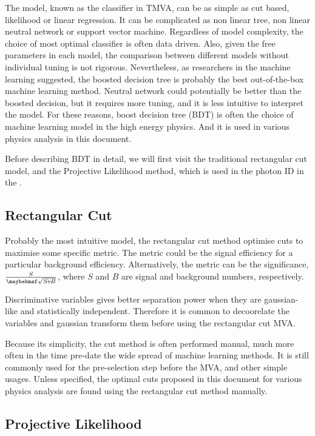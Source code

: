 The model, known as the classifier in TMVA, can be as simple as cut based, likelihood or linear regression. It can be complicated as non linear tree, non linear neutral network or support vector machine. Regardless of model complexity, the choice of most optimal classifier is often data driven. Also, given the free parameters in each model, the comparison between different models without individual tuning is not rigorous. Nevertheless, as researchers in the machine learning suggested, the boosted decision tree is probably the best out-of-the-box machine learning method. Neutral network could potentially be better than the boosted decision, but it requires more tuning, and it is less intuitive to interpret the model. For these reasons, boost decision tree (BDT) is often the choice of machine learning model in the high energy physics. And it is used in various physics analysis in this document.

Before describing BDT in detail, we will first visit the traditional rectangular cut model, and the Projective Likelihood method, which is used in the photon ID in the \pandora.



\subsection{Rectangular Cut}

Probably the most intuitive model, the rectangular cut method optimise cuts to maximise some specific metric. The metric could be the signal efficiency for a particular background efficiency. Alternatively, the metric can be the significance, $\frac{S}{\rootOf{S\!+\!B}}$, where $S$ and $B$ are signal and background numbers, respectively.

Discriminative variables gives better separation power when they are gaussian-like and statistically independent. Therefore it is common to decoorelate  the variables and gaussian transform them before using the rectangular cut MVA.

Because its simplicity, the cut method is often performed manual, much more often in the time pre-date the wide spread of machine learning methods. It is still commonly used for the pre-selection step before the MVA, and other simple usages. Unless specified, the optimal cuts proposed in this document for various physics analysis are found using the rectangular cut method manually.

\subsection{Projective Likelihood}

